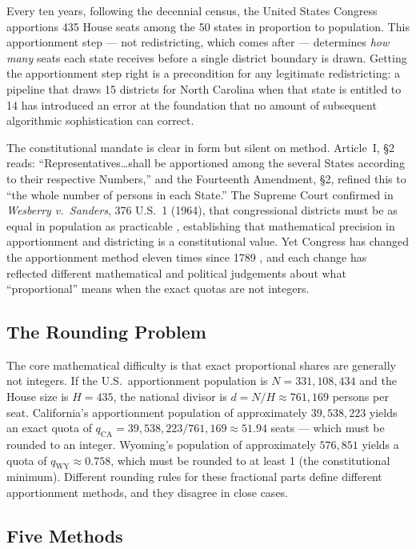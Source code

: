 Every ten years, following the decennial census, the United States Congress
apportions 435 House seats among the 50 states in proportion to population.
This apportionment step --- not redistricting, which comes after --- determines
\emph{how many} seats each state receives before a single district boundary
is drawn.
Getting the apportionment step right is a precondition for any legitimate
redistricting: a pipeline that draws 15 districts for North Carolina
when that state is entitled to 14 has introduced an error at the foundation
that no amount of subsequent algorithmic sophistication can correct.

The constitutional mandate is clear in form but silent on method.
Article~I, \S2 reads: ``Representatives\ldots shall be apportioned among
the several States according to their respective Numbers,'' and
the Fourteenth Amendment, \S2, refined this to ``the whole number of persons
in each State.''
The Supreme Court confirmed in \textit{Wesberry v.\ Sanders}, 376 U.S.\ 1
(1964), that congressional districts must be as equal in population as
practicable \citep{wesberry1964}, establishing that mathematical precision
in apportionment and districting is a constitutional value.
Yet Congress has changed the apportionment method eleven times since 1789
\citep{balinski1982fair}, and each change has reflected different
mathematical and political judgements about what ``proportional'' means
when the exact quotas are not integers.

\subsection{The Rounding Problem}

The core mathematical difficulty is that exact proportional shares are
generally not integers.
If the U.S.\ apportionment population is $N = 331{,}108{,}434$ and the
House size is $H = 435$, the national divisor is $d = N/H \approx 761{,}169$
persons per seat.
California's apportionment population of approximately $39{,}538{,}223$
yields an exact quota of $q_{\text{CA}} = 39{,}538{,}223 / 761{,}169
\approx 51.94$ seats --- which must be rounded to an integer.
Wyoming's population of approximately $576{,}851$ yields a quota of
$q_{\text{WY}} \approx 0.758$, which must be rounded to at least 1
(the constitutional minimum).
Different rounding rules for these fractional parts define different
apportionment methods, and they disagree in close cases.

\subsection{Five Methods}


